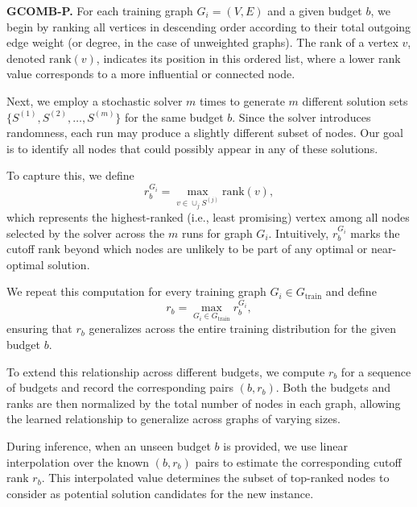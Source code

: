 \textbf{GCOMB-P.} For each training graph $G_i = (V, E)$ and a given budget $b$, we begin by ranking all vertices in descending order according to their total outgoing edge weight (or degree, in the case of unweighted graphs). The rank of a vertex $v$, denoted $\text{rank}(v)$, indicates its position in this ordered list, where a lower rank value corresponds to a more influential or connected node.

Next, we employ a stochastic solver $m$ times to generate $m$ different solution sets $\{S^{(1)}, S^{(2)}, \ldots, S^{(m)}\}$ for the same budget $b$. Since the solver introduces randomness, each run may produce a slightly different subset of nodes. Our goal is to identify all nodes that could possibly appear in any of these solutions.

To capture this, we define
\[
r^{G_i}_{b} = \max_{v \in \cup_j S^{(j)}} \text{rank}(v),
\]
which represents the highest-ranked (i.e., least promising) vertex among all nodes selected by the solver across the $m$ runs for graph $G_i$. Intuitively, $r^{G_i}_{b}$ marks the cutoff rank beyond which nodes are unlikely to be part of any optimal or near-optimal solution.

We repeat this computation for every training graph $G_i \in G_{\text{train}}$ and define
\[
r_{b} = \max_{G_i \in G_{\text{train}}} r^{G_i}_{b},
\]
ensuring that $r_b$ generalizes across the entire training distribution for the given budget $b$.

To extend this relationship across different budgets, we compute $r_b$ for a sequence of budgets and record the corresponding pairs $(b, r_b)$. Both the budgets and ranks are then normalized by the total number of nodes in each graph, allowing the learned relationship to generalize across graphs of varying sizes.

During inference, when an unseen budget $b$ is provided, we use linear interpolation over the known $(b, r_b)$ pairs to estimate the corresponding cutoff rank $r_b$. This interpolated value determines the subset of top-ranked nodes to consider as potential solution candidates for the new instance.



